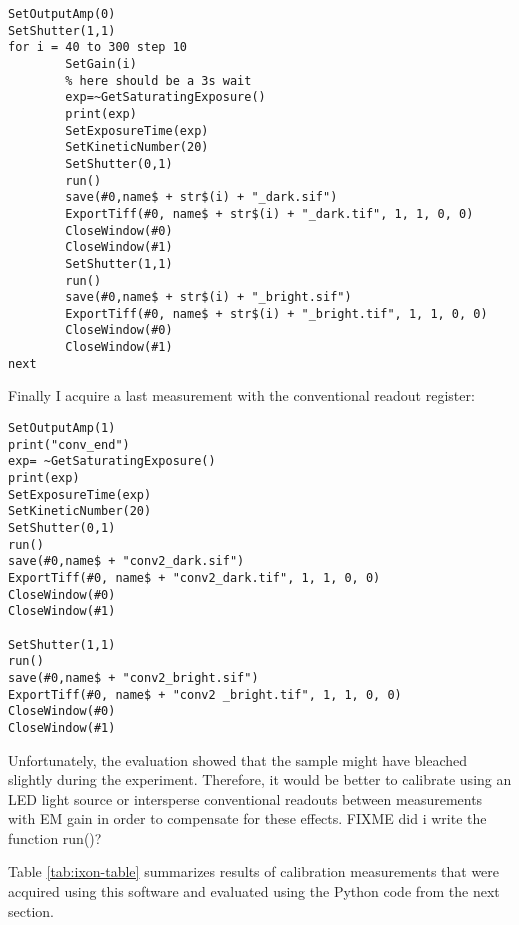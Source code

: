 \begin{lstlisting}[style=mybasic]
SetOutputAmp(0)
SetShutter(1,1)
for i = 40 to 300 step 10
        SetGain(i)
        % here should be a 3s wait
        exp=~GetSaturatingExposure()
        print(exp)
        SetExposureTime(exp)
        SetKineticNumber(20)
        SetShutter(0,1)
        run()
        save(#0,name$ + str$(i) + "_dark.sif")
        ExportTiff(#0, name$ + str$(i) + "_dark.tif", 1, 1, 0, 0)
        CloseWindow(#0)
        CloseWindow(#1)
        SetShutter(1,1)
        run()
        save(#0,name$ + str$(i) + "_bright.sif")
        ExportTiff(#0, name$ + str$(i) + "_bright.tif", 1, 1, 0, 0)
        CloseWindow(#0)
        CloseWindow(#1)
next
\end{lstlisting}
Finally I acquire a last measurement with the conventional readout
register: \begin{lstlisting}[style=mybasic]
SetOutputAmp(1)
print("conv_end")
exp= ~GetSaturatingExposure()
print(exp)
SetExposureTime(exp)
SetKineticNumber(20)
SetShutter(0,1)
run()
save(#0,name$ + "conv2_dark.sif")
ExportTiff(#0, name$ + "conv2_dark.tif", 1, 1, 0, 0)
CloseWindow(#0)
CloseWindow(#1)
        
SetShutter(1,1)
run()
save(#0,name$ + "conv2_bright.sif")
ExportTiff(#0, name$ + "conv2 _bright.tif", 1, 1, 0, 0)
CloseWindow(#0)
CloseWindow(#1)
\end{lstlisting}
Unfortunately, the evaluation showed that the sample might have
bleached slightly during the experiment. Therefore, it would be better
to calibrate using an LED light source or intersperse conventional
readouts between measurements with EM gain in order to compensate for
these effects. FIXME did i write the function run()?

Table \ref{tab:ixon-table} summarizes results of calibration
measurements that were acquired using this software and evaluated
using the Python code from the next section.


